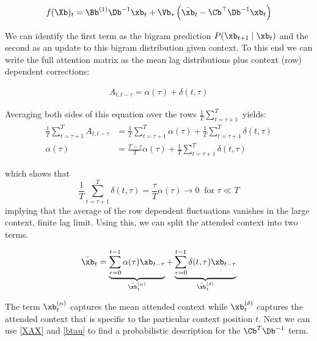 \documentclass{article}
\begin{document}
\begin{align}
    f(\Xb)_t = \Bb^{(1)}\Db^{-1}\xb_t + \Vb_* \left ( \bar{\xb}_t - \Cb^\top\Db^{-1} \xb_t \right ) 
\end{align} 

We can identify the first term as the bigram prediction $P(\xb_{t+1} \mid \xb_t)$ and the second as an update to this bigram distribution given context. To this end we can write the full attention matrix as the mean lag distributions plus context (row) dependent corrections:

\begin{align}
    A_{t,t-\tau} = \alpha(\tau) + \delta(t, \tau)
\end{align}

Averaging both sides of this equation over the rows $\frac{1}{T}\sum_{t=\tau+1}^T$ yields:
\begin{align}
    \frac{1}{T}\sum_{t=\tau+1}^T A_{t,t-\tau} &= \frac{1}{T}\sum_{t=\tau+1}^T \alpha(\tau) + \frac{1}{T}\sum_{t=\tau+1}^T\delta(t, \tau) \\
    \alpha(\tau) &= \frac{T-\tau}{T}\alpha(\tau) + \frac{1}{T}\sum_{t=\tau+1}^T\delta(t, \tau)
\end{align}

which shows that 
\begin{equation}
    \frac{1}{T}\sum_{t=\tau+1}^T  \delta(t, \tau) = \frac{\tau}{T} \alpha(\tau) \to 0 \;\; \text{for $\tau \ll T$}
\end{equation}
implying that the average of the row dependent fluctuations vanishes in the large context, finite lag limit. Using this, we can split the attended context into two terms.

\begin{align}
    \bar{\xb}_t = \underbrace{\sum_{\tau=0}^{t-1}\alpha(\tau)\xb_{t-\tau}}_{\bar{\xb}_t^{(\alpha)}} +  \underbrace{\sum_{\tau=0}^{t-1}\delta(t,\tau)\xb_{t-\tau}}_{\bar{\xb}_t^{(\delta)}}
\end{align}

The term $\xb_t^{(\alpha)}$ captures the mean attended context while $\xb_t^{(\delta)}$ captures the attended context that is specific to the particular context position $t$. Next we can use \eqref{XAX} and \eqref{btau} to find a probabilistic description for the $\Cb^T\Db^{-1}$ term. 
\end{document}
